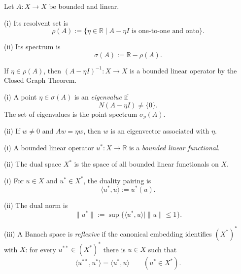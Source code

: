 \begin{definition}
\label{def:resolvent-set-spectrum-appendix-d}
Let $A:X\to X$ be bounded and linear.

(i) Its resolvent set is
\[
\rho(A):=\{\eta\in\mathbb R\mid A-\eta I
\text{ is one-to-one and onto}\}.
\]

(ii) Its spectrum is
\[
\sigma(A):=\mathbb R-\rho(A).
\]
\end{definition}

\begin{remark}
\label{rem:resolvent-inverse-bounded}

If $\eta\in\rho(A)$, then $(A-\eta I)^{-1}:X\to X$ is a bounded linear operator by the Closed Graph Theorem.
\end{remark}

\begin{definition}
\label{def:eigenvalue-eigenvector-appendix-d}

(i) A point $\eta\in\sigma(A)$ is an \textit{eigenvalue} if
\[
N(A-\eta I)\ne\{0\}.
\]
The set of eigenvalues is the point spectrum $\sigma_p(A)$.

(ii) If $w\ne0$ and $Aw=\eta w$, then $w$ is an eigenvector associated with $\eta$.
\end{definition}

\begin{definition}
\label{def:bounded-linear-functional-dual-space}
(i) A bounded linear operator $u^*:X\to\mathbb R$ is a \textit{bounded linear functional}.

(ii) The dual space $X^*$ is the space of all bounded linear functionals on $X$.
\end{definition}

\begin{definition}
\label{def:dual-pairing-reflexive-banach-space}

(i) For $u\in X$ and $u^*\in X^*$, the duality pairing is
\[
\langle u^*,u\rangle:=u^*(u).
\]

(ii) The dual norm is
\[
\|u^*\|:=\sup\{\langle u^*,u\rangle\mid\|u\|\leq1\}.
\]

(iii) A Banach space is \textit{reflexive} if the canonical embedding identifies $(X^*)^*$ with $X$: for every $u^{**}\in(X^*)^*$ there is $u\in X$ such that
\[
\langle u^{**},u^*\rangle=\langle u^*,u\rangle
\qquad(u^*\in X^*).
\]
\end{definition}

